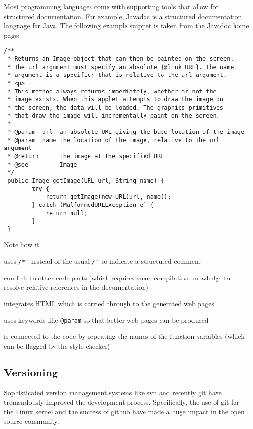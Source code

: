 Most programming languages come with supporting tools that allow for structured documentation. 
For example, Javadoc is a structured documentation language for Java.
The following example snippet is taken from the Javadoc home page:

\begin{lstlisting}
/**
 * Returns an Image object that can then be painted on the screen. 
 * The url argument must specify an absolute {@link URL}. The name
 * argument is a specifier that is relative to the url argument. 
 * <p>
 * This method always returns immediately, whether or not the 
 * image exists. When this applet attempts to draw the image on
 * the screen, the data will be loaded. The graphics primitives 
 * that draw the image will incrementally paint on the screen. 
 *
 * @param  url  an absolute URL giving the base location of the image
 * @param  name the location of the image, relative to the url argument
 * @return      the image at the specified URL
 * @see         Image
 */
 public Image getImage(URL url, String name) {
        try {
            return getImage(new URL(url, name));
        } catch (MalformedURLException e) {
            return null;
        }
 }
\end{lstlisting}

Note how it
\begin{compactitem}
 \item uses \lstinline|/**| instead of the usual \lstinline|/*| to indicate a structured comment
 \item can link to other code parts (which requires some compilation knowledge to resolve relative references in the documentation)
 \item integrates HTML which is carried through to the generated web pages
 \item uses keywords like \lstinline|@param| so that better web pages can be produced
 \item is connected to the code by repeating the names of the function variables (which can be flagged by the style checker)
\end{compactitem}

\subsection{Versioning}

Sophisticated version management systems like svn and recently git have tremendously improved the development process.
Specifically, the use of git for the Linux kernel and the success of github have made a huge impact in the open source community.

